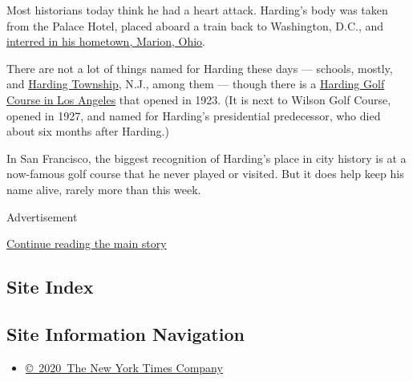 Most historians today think he had a heart attack. Harding's body was
taken from the Palace Hotel, placed aboard a train back to Washington,
D.C., and
\href{https://www.ohiohistory.org/visit/museum-and-site-locator/warren-g-harding-home-memorial}{interred
in his hometown, Marion, Ohio}.

There are not a lot of things named for Harding these days --- schools,
mostly, and
\href{https://www.nytimes3xbfgragh.onion/2019/03/27/realestate/harding-township-nj-a-historic-place-that-feels-like-the-country.html}{Harding
Township}, N.J., among them --- though there is a
\href{https://www.golf.lacity.org/course_harding/}{Harding Golf Course
in Los Angeles} that opened in 1923. (It is next to Wilson Golf Course,
opened in 1927, and named for Harding's presidential predecessor, who
died about six months after Harding.)

In San Francisco, the biggest recognition of Harding's place in city
history is at a now-famous golf course that he never played or visited.
But it does help keep his name alive, rarely more than this week.

Advertisement

\protect\hyperlink{after-bottom}{Continue reading the main story}

\hypertarget{site-index}{%
\subsection{Site Index}\label{site-index}}

\hypertarget{site-information-navigation}{%
\subsection{Site Information
Navigation}\label{site-information-navigation}}

\begin{itemize}
\tightlist
\item
  \href{https://help.nytimes3xbfgragh.onion/hc/en-us/articles/115014792127-Copyright-notice}{©~2020~The
  New York Times Company}
\end{itemize}

